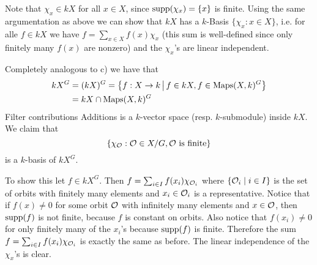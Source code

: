 Note that $\chi_x \in kX$ for all $x \in X$, since $\operatorname{supp}(\chi_x) = \{x\}$ is finite. Using the same argumentation as above we can show that $kX$ has a $k$-Basis $\{\chi_x : x \in X\}$, i.e. for alle $f \in kX$ we have $f = \sum_{x \in X} f(x) \chi_x$ (this sum is well-defined since only finitely many $f(x)$ are nonzero) and the $\chi_x$’s are linear independent.

Completely analogous to c) we have that
\begin{align*}
 kX^G
 &= (kX)^G = \left\{f : X \to k \,\middle|\, f \in kX, f \in \operatorname{Maps}(X,k)^G\right\} \\
 &= kX \cap \operatorname{Maps}(X,k)^G
\end{align*}Filter contributions
Additions
is a $k$-vector space (resp. $k$-submodule) inside $kX$. We claim that
\[
 \{\chi_\mathcal{O} : \mathcal{O} \in X/G, \mathcal{O} \text{ is finite}\}
\]
is a $k$-basis of $kX^G$.

To show this let $f \in kX^G$. Then $f = \sum_{i \in I} f(x_i) \chi_{\mathcal{O}_i}$ where $\{\mathcal{O}_i \mid i \in I\}$ is the set of orbits with finitely many elements and $x_i \in \mathcal{O}_i$ is a representative. Notice that if $f(x) \neq 0$ for some orbit $\mathcal{O}$ with infinitely many elements and $x \in \mathcal{O}$, then $\operatorname{supp}(f)$ is not finite, because $f$ is constant on orbits. Also notice that $f(x_i) \neq 0$ for only finitely many of the $x_i$’s because $\operatorname{supp}(f)$ is finite. Therefore the sum $f = \sum_{i \in I} f(x_i) \chi_{\mathcal{O}_i}$ is exactly the same as before. The linear independence of the $\chi_x$’s is clear.


